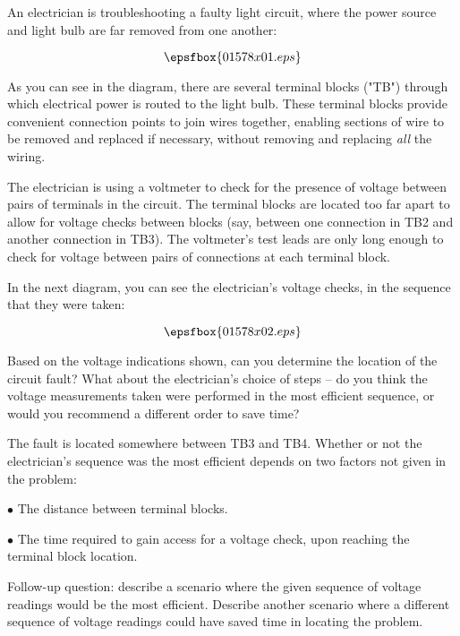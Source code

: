 

An electrician is troubleshooting a faulty light circuit, where the power source and light bulb are far removed from one another:

$$\epsfbox{01578x01.eps}$$

As you can see in the diagram, there are several terminal blocks ("TB") through which electrical power is routed to the light bulb.  These terminal blocks provide convenient connection points to join wires together, enabling sections of wire to be removed and replaced if necessary, without removing and replacing {\it all} the wiring.

The electrician is using a voltmeter to check for the presence of voltage between pairs of terminals in the circuit.  The terminal blocks are located too far apart to allow for voltage checks between blocks (say, between one connection in TB2 and another connection in TB3).  The voltmeter's test leads are only long enough to check for voltage between pairs of connections at each terminal block.

In the next diagram, you can see the electrician's voltage checks, in the sequence that they were taken:

$$\epsfbox{01578x02.eps}$$

Based on the voltage indications shown, can you determine the location of the circuit fault?  What about the electrician's choice of steps -- do you think the voltage measurements taken were performed in the most efficient sequence, or would you recommend a different order to save time?







The fault is located somewhere between TB3 and TB4.  Whether or not the electrician's sequence was the most efficient depends on two factors not given in the problem:

\medskip
\item{$\bullet$} The distance between terminal blocks.
\item{$\bullet$} The time required to gain access for a voltage check, upon reaching the terminal block location.
\medskip

Follow-up question: describe a scenario where the given sequence of voltage readings would be the most efficient.  Describe another scenario where a different sequence of voltage readings could have saved time in locating the problem.

